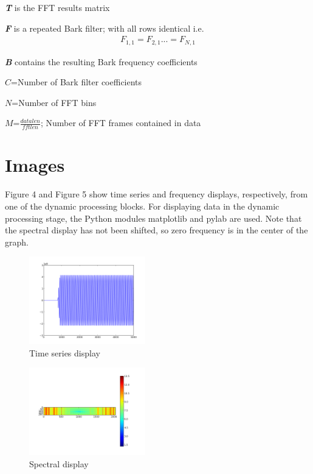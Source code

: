 \documentclass[journal]{IEEEtran}
\begin{document}
\textbf{\emph{T}} is the FFT results matrix 

\textbf{\emph{F}} is a repeated Bark filter; with all rows identical i.e.
\begin{align}F_{1,1}=F_{2,1}...=F_{N,1} \nonumber \end{align}

\textbf{\emph{B}} contains the resulting Bark frequency coefficients

\begin{math}C\end{math}=Number of Bark filter coefficients

\begin{math}N\end{math}=Number of FFT bins

\begin{math}M\end{math}=\begin{math}\frac{datalen}{fftlen}\end{math}; Number of FFT frames contained in data

\section{Images}
Figure 4 and Figure 5 show time series and frequency displays, respectively, from one of the dynamic processing blocks. For displaying data in
 the dynamic processing stage, the Python modules matplotlib and pylab are used. Note that the spectral display has not been shifted, 
so zero frequency is in the center of the graph.

\begin{figure}[h!]
\centering
  \includegraphics[width=0.45\textwidth]{fig4.png}
\caption{Time series display}
\end{figure}

\begin{figure}[h!]
\centering
  \includegraphics[width=0.45\textwidth]{fig5.png}
\caption{Spectral display}
\end{figure}
\end{document}
